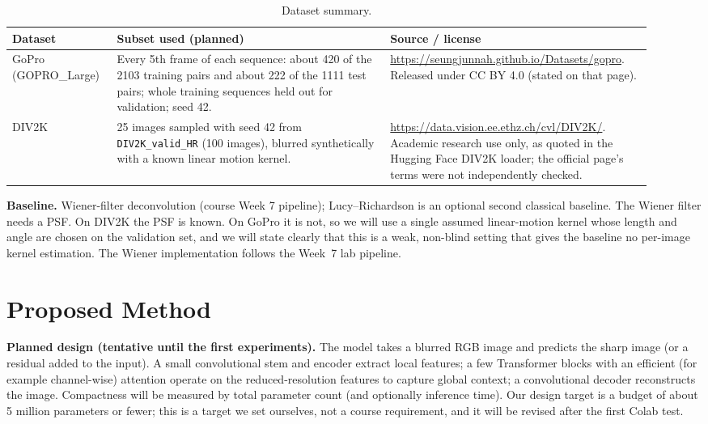\documentclass[11pt]{article}
\begin{document}
\begin{table}[h]
\centering
\caption{Dataset summary.}
\label{tab:data}
\begin{tabular}{@{}p{0.14\linewidth}p{0.40\linewidth}p{0.38\linewidth}@{}}
\toprule
\textbf{Dataset} & \textbf{Subset used (planned)} & \textbf{Source / license} \\
\midrule
GoPro (GOPRO\_Large) & Every 5th frame of each sequence: about 420 of the 2103 training pairs and about 222 of the 1111 test pairs; whole training sequences held out for validation; seed 42. & \footnotesize \url{https://seungjunnah.github.io/Datasets/gopro}. Released under CC BY 4.0 (stated on that page). \\
DIV2K & 25 images sampled with seed 42 from \texttt{DIV2K\_valid\_HR} (100 images), blurred synthetically with a known linear motion kernel. & \footnotesize \url{https://data.vision.ee.ethz.ch/cvl/DIV2K/}. Academic research use only, as quoted in the Hugging Face DIV2K loader; the official page's terms were not independently checked. \\
\bottomrule
\end{tabular}
\end{table}

\textbf{Baseline.} Wiener-filter deconvolution (course Week 7 pipeline); Lucy--Richardson is an
optional second classical baseline. The Wiener filter needs a PSF. On DIV2K the PSF is
known. On GoPro it is not, so we will use a single assumed linear-motion kernel whose
length and angle are chosen on the validation set, and we will state clearly that this
is a weak, non-blind setting that gives the baseline no per-image kernel estimation.
The Wiener implementation follows the Week~7 lab pipeline.

\section{Proposed Method}
\label{sec:method}
\textbf{Planned design (tentative until the first experiments).} The model takes a blurred RGB image and predicts
the sharp image (or a residual added to the input). A small convolutional stem and
encoder extract local features; a few Transformer blocks with an efficient (for example
channel-wise) attention operate on the reduced-resolution features to capture global
context; a convolutional decoder reconstructs the image. Compactness will be measured by
total parameter count (and optionally inference time). Our design target is a budget of
about 5 million parameters or fewer; this is a target we set ourselves, not a course requirement, and
it will be revised after the first Colab test.
\end{document}
